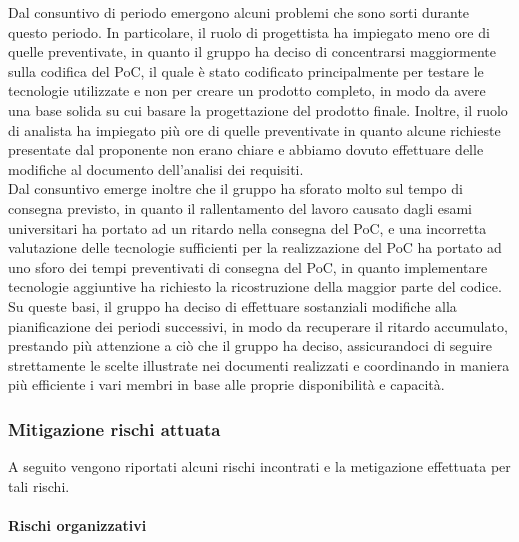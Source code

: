 Dal consuntivo di periodo emergono alcuni problemi che sono sorti durante questo periodo. 
In particolare, il ruolo di progettista ha impiegato meno ore di quelle preventivate, in quanto il gruppo ha deciso di concentrarsi maggiormente sulla codifica
del PoC, il quale è stato codificato principalmente per testare le tecnologie utilizzate e non per creare un prodotto completo, in modo da avere una base solida
su cui basare la progettazione del prodotto finale. Inoltre, il ruolo di analista ha impiegato più ore di quelle preventivate in quanto alcune richieste presentate
 dal proponente non erano chiare e abbiamo dovuto effettuare delle modifiche al documento dell'analisi dei requisiti.\\
Dal consuntivo emerge inoltre che il gruppo ha sforato molto sul tempo di consegna previsto, in quanto il rallentamento del lavoro causato dagli esami universitari
ha portato ad un ritardo nella consegna del PoC, e una incorretta valutazione delle tecnologie sufficienti per la realizzazione del PoC ha portato ad uno sforo dei
tempi preventivati di consegna del PoC, in quanto implementare tecnologie aggiuntive ha richiesto la ricostruzione della maggior parte del codice.\\
Su queste basi, il gruppo ha deciso di effettuare sostanziali modifiche alla pianificazione dei periodi successivi, in modo da recuperare il ritardo accumulato,
prestando più attenzione a ciò che il gruppo ha deciso, assicurandoci di seguire strettamente le scelte illustrate nei documenti realizzati e coordinando in maniera
più efficiente i vari membri in base alle proprie disponibilità e capacità.\\


\subsubsection{Mitigazione rischi attuata}\label{sec:consuntivo:analisi:mitigazione}

A seguito vengono riportati alcuni rischi incontrati e la metigazione effettuata per tali rischi.\\

\paragraph{Rischi organizzativi}

